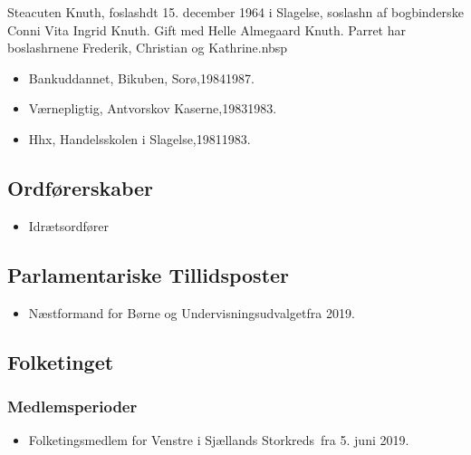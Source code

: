 \documentclass[11pt, a4paper]{awesome-cv}
\begin{document}
\makecvheader[R]
\makelettertitle
\begin{cvletter}
Steacuten Knuth, foslashdt 15. december 1964 i Slagelse, soslashn af bogbinderske Conni Vita Ingrid Knuth. Gift med Helle Almegaard Knuth. Parret har boslashrnene Frederik, Christian og Kathrine.nbsp

\begin{itemize}
\item Bankuddannet, Bikuben, Sorø,19841987.
\item Værnepligtig, Antvorskov Kaserne,19831983.
\item Hhx, Handelsskolen i Slagelse,19811983.
\end{itemize}
\subsection*{Ordførerskaber}
\begin{itemize}
\item Idrætsordfører
\end{itemize}
\subsection*{Parlamentariske Tillidsposter}
\begin{itemize}
\item Næstformand for Børne og Undervisningsudvalgetfra 2019.
\end{itemize}
\subsection*{Folketinget}
\subsubsection*{Medlemsperioder}
\begin{itemize}
\item Folketingsmedlem for Venstre i Sjællands Storkreds fra 5. juni 2019.
\end{itemize}

\end{cvletter}
\end{document}
